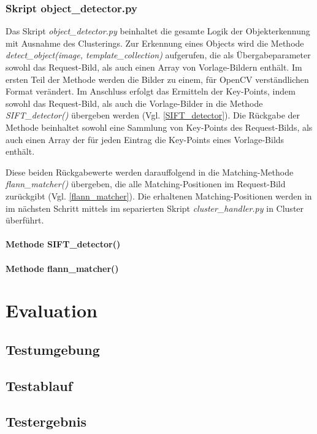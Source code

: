 \documentclass[
    type=Projektarbeit,
    status=draft, %
    language=german, %
    bibengine=bibtex,
]{unibwm-inf-thesis}
\begin{document}
    \subsection{Skript object\_detector.py}
    Das Skript \textit{object\_detector.py} beinhaltet die gesamte Logik der Objekterkennung mit Ausnahme des Clusterings.
    Zur Erkennung eines Objects wird die Methode \textit{detect\_object(image, template\_collection)} aufgerufen, die als Übergabeparameter sowohl das Request-Bild, als auch einen Array von Vorlage-Bildern enthält.
    Im ersten Teil der Methode werden die Bilder zu einem, für OpenCV verständlichen Format verändert.
    Im Anschluss erfolgt das Ermitteln der Key-Points, indem sowohl das Request-Bild, als auch die Vorlage-Bilder in die Methode \textit{SIFT\_detector()} übergeben werden (Vgl. \autoref{SIFT_detector}).
    Die Rückgabe der Methode beinhaltet sowohl eine Sammlung von Key-Points des Request-Bilds, als auch einen Array der für jeden Eintrag die Key-Points eines Vorlage-Bilds enthält.

    Diese beiden Rückgabewerte werden darauffolgend in die Matching-Methode \textit{flann\_matcher()} übergeben, die alle Matching-Positionen im Request-Bild zurückgibt (Vgl. \autoref{flann_matcher}).
    Die erhaltenen Matching-Positionen werden in im nächsten Schritt mittels im separierten Skript \textit{cluster\_handler.py} in Cluster überführt.


    \subsubsection{Methode SIFT\_detector()} \label{SIFT_detector}

    \subsubsection{Methode flann\_matcher()} \label{flann_matcher}

    \chapter{Evaluation}
    \section{Testumgebung}
    \section{Testablauf}
    \section{Testergebnis}
\end{document}
